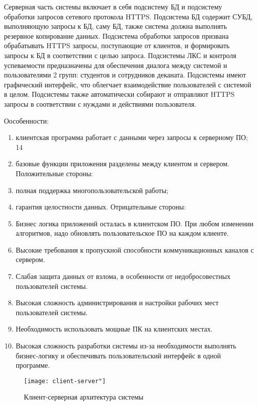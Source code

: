 \documentclass[a4paper,14pt]{extarticle}
\begin{document}
Серверная часть системы включает в себя подсистему БД и подсистему обработки запросов сетевого протокола HTTPS. Подсистема БД содержит СУБД, выполняющую запросы к БД, саму БД, также система должна выполнять резервное копирование данных. Подсистема обработки запросов призвана обрабатывать HTTPS запросы, поступающие от клиентов, и формировать запросы к БД в соответствии с целью запроса.
Подсистемы ЛКС и контроля успеваемости предназначены для обеспечения диалога между системой и пользователями 2 групп: студентов и сотрудников деканата. Подсистемы имеют графический интерфейс, что облегчает взаимодействие пользователей с системой в целом. Подсистемы также автоматически собирают и отправляют HTTPS запросы в соответствии с нуждами и действиями пользователя.


Оособенности:
\begin{enumerate}
\item  клиентская программа работает с данными через запросы к
серверному ПО;
14
\item  базовые функции приложения разделены между клиентом и
сервером.
Положительные стороны:
\item  полная поддержка многопользовательской работы;
\item  гарантия целостности данных.
Отрицательные стороны:
\item  Бизнес логика приложений осталась в клиентском ПО. При
любом изменении алгоритмов, надо обновлять пользовательское
ПО на каждом клиенте.
\item  Высокие требования к пропускной способности
коммуникационных каналов с сервером.
\item  Слабая защита данных от взлома, в особенности от
недобросовестных пользователей системы.
\item  Высокая сложность администрирования и настройки рабочих
мест пользователей системы.
\item  Необходимость использовать мощные ПК на клиентских местах.
\item  Высокая сложность разработки системы из-за необходимости
выполнять бизнес-логику и обеспечивать пользовательский
интерфейс в одной программе.
\end{enumerate}

\begin{figure}[h!]
	\centering
	\texttt{[image: client-server"]}
	\caption{Клиент-серверная архитектура системы}
	\label{fig:client-server}
\end{figure}
\end{document}
